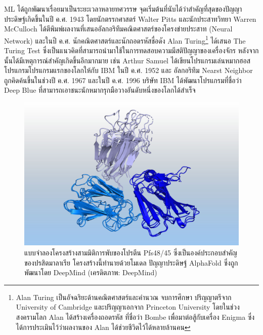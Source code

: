 ML ได้ถูกพัฒนาเรื่อยมาเป็นระยะเวลาหลายทศวรรษ จุดเริ่มต้นที่นับได้ว่าสำคัญที่สุดของปัญญาประดิษฐ์เกิดขึ้นในปี ค.ศ. 1943 โดยนักตรรกศาสตร์
Walter Pitts และนักประสาทวิทยา Warren McCulloch ได้ตีพิมพ์ผลงานที่เสนออัลกอริทึมคณิตศาสตร์ของโครงข่ายประสาท (Neural Network) 
และในปี ค.ศ. นักคณิตศาสตร์และนักถอดรหัสชื่อดัง Alan Turing\footnote{Alan Turing เป็นอัจฉริยะด้านคณิตศาสตร์และคำนวณ จบการศึกษา%
ปริญญาตรีจาก University of Cambridge และปริญญาเอกจาก Princeton University โดยในช่วงสงครามโลก Alan ได้สร้างเครื่องถอดรหัส%
ที่ชื่อว่า Bombe เพื่อมาต่อสู้กับเครื่อง Enigma ซึ่งได้การประเมินไว้ว่าผลงานของ Alan ได้ช่วยชีวิตไว้ได้หลายล้านคน} ได้เสนอ The Turing Test 
ซึ่งเป็นแนวคิดที่สามารถนำมาใช้ในการทดสอบความมีสติปัญญาของเครื่องจักร หลังจากนั้นได้มีเหตุการณ์สำคัญเกิดขึ้นอีกมากมาย เช่น Arthur Samuel 
ได้เขียนโปรแกรมเล่นหมากฮอสโปรแกรมโปรแกรมแรกของโลกให้กับ IBM ในปี ค.ศ. 1952 และ อัลกอริทึม Nearst Neighbor ถูกคิดค้นขึ้นในช่วงปี 
ค.ศ. 1967 และในปี ค.ศ. 1996 บริษัท IBM ได้พัฒนาโปรแกรมที่ชื่อว่า Deep Blue ที่สามารถเอาชนะนักหมากรุกมือวางอันดับหนึ่งของโลกได้สำเร็จ

\begin{figure}[H]
    \centering
    \includegraphics[width=\linewidth]{fig/malaria-parasite-protein-deepmind.jpeg}
    \caption{แบบจำลองโครงสร้างสามมิติการพับของโปรตีน Pfs48/45 ซึ่งเป็นองค์ประกอบสำคัญของปรสิตมาลาเรีย โครงสร้างนี้ทำนายด้วยโมเดล 
    ปัญญาประดิษฐ์ AlphaFold ซึ่งถูกพัฒนาโดย DeepMind (เครดิตภาพ: DeepMind)}
    \label{fig:malaria_parasite}
\end{figure}

